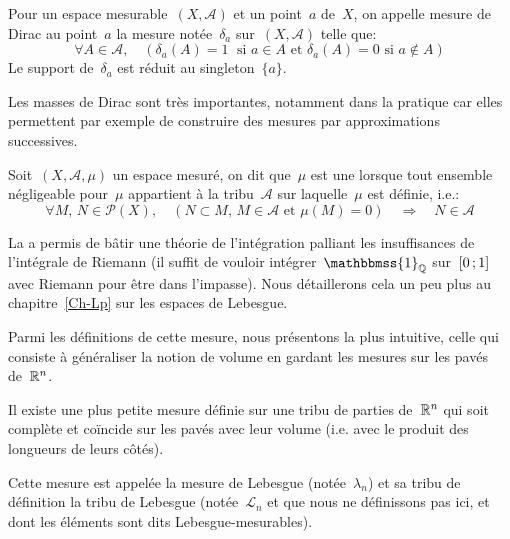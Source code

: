 \begin{definition}
Pour un espace mesurable~$(X,\mathcal{A})$ et un point~$a$ de~$X$, on appelle mesure de Dirac au point~$a$ la mesure notée~$\delta_a$ sur~$(X, \mathcal{A})$ telle que:
\begin{equation}
  \forall A \in \mathcal{A},\quad ( \delta_a(A)=1 \; \text{ si } a \in A \text{ et } \delta_a(A)=0  \text{ si } a \notin A )
\end{equation}
Le support de~$\delta_a$ est réduit au singleton~$\{a\}$.
\end{definition}

Les masses de Dirac sont très importantes, notamment dans la pratique car elles permettent par exemple de construire des mesures par approximations successives.


\begin{definition}
Soit~$(X,\mathcal{A},\mu)$ un espace mesuré, on dit que~$\mu$ est une  lorsque tout ensemble négligeable pour~$\mu$ appartient à la tribu~$\mathcal{A}$ sur laquelle~$\mu$ est définie, i.e.:
\begin{equation}
\forall M,\, N\in\mathcal{P}(X),\quad \left(N\subset M,\, M\in\mathcal{A} \text{ et } \mu(M)=0\right)\quad\Rightarrow\quad N\in\mathcal{A}
\end{equation}
\end{definition}

\medskip
La  a permis de bâtir une théorie de l'intégration palliant les insuffisances de l'intégrale de Riemann (il suffit de vouloir intégrer~$\mathbbmss{1}_{\QQ}$ sur~$\mathopen{[}0\,;1\mathclose{]}$ avec Riemann pour être dans l'impasse).
Nous détaillerons cela un peu plus au chapitre~\ref{Ch-Lp} sur les espaces de Lebesgue.\label{Sec-impasse}

Parmi les définitions de cette mesure, nous présentons la plus intuitive, celle qui consiste à généraliser la notion de volume en gardant les mesures sur les pavés de~$\mathbb R^n$.

\begin{definition}
Il existe une plus petite mesure définie sur une tribu de parties de~$\mathbb R^n$ qui soit complète et coïncide sur les pavés avec leur volume (i.e. avec le produit des longueurs de leurs côtés).

Cette mesure est appelée la mesure de Lebesgue (notée~$\lambda_n$) et sa tribu de définition la tribu de Lebesgue (notée~$\mathcal L_n$ et que nous ne définissons pas ici, et dont les éléments sont dits Lebesgue-mesurables).
\end{definition}

